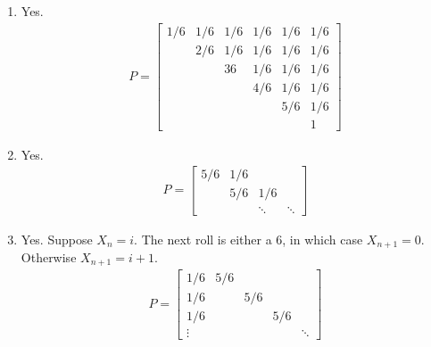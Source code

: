 \documentclass[10pt]{article}
\begin{document}
\begin{solution}[Solution]
\begin{enumerate}[label=(\alph*)]
	\item Yes.
        \begin{align*}
            P = 
            \left[\begin{array}{cccccc}
                1/6 & 1/6 & 1/6 & 1/6 & 1/6 & 1/6 \\
                & 2/6 & 1/6 & 1/6 & 1/6 & 1/6 \\
                && 36 & 1/6 & 1/6 & 1/6 \\
                &&& 4/6 & 1/6 & 1/6 \\
                &&&& 5/6 & 1/6 \\
                &&&& & 1
            \end{array}\right]
        \end{align*}
        
	\item Yes.
        \begin{align*}
            P=
            \left[\begin{array}{cccc}
                5/6 & 1/6 \\
                & 5/6 & 1/6 \\
                && \ddots & \ddots
            \end{array}\right]
        \end{align*}
        
    \item Yes. Suppose \( X_n = i \). The next roll is either a 6, in which case \( X_{n+1} = 0 \). Otherwise \( X_{n+1} = i+1 \).  
        \begin{align*}
            P = \left[\begin{array}{ccccc}
            1/6 & 5/6 \\
            1/6 & & 5/6 \\
            1/6 &  & & 5/6 \\
            \vdots & & & & \ddots
            \end{array}\right]
        \end{align*}
        

\end{enumerate}
\end{solution}
\end{document}
